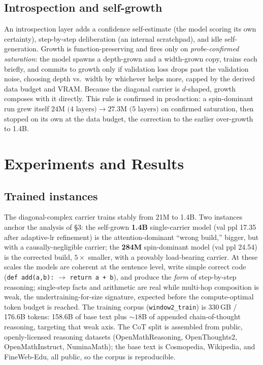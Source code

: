 \documentclass[11pt]{article}
\newcommand{\code}[1]{\texttt{#1}}
\begin{document}
\subsection{Introspection and self-growth}
An introspection layer adds a confidence self-estimate (the model scoring its own certainty), step-by-step deliberation (an internal scratchpad), and idle self-generation. Growth is function-preserving and fires only on \emph{probe-confirmed saturation}: the model spawns a depth-grown and a width-grown copy, trains each briefly, and commits to growth only if validation loss drops past the validation noise, choosing depth vs.\ width by whichever helps more, capped by the derived data budget and VRAM. Because the diagonal carrier is $d$-shaped, growth composes with it directly. This rule is confirmed in production: a spin-dominant run grew itself $24\text{M (4 layers)} \to 27.3\text{M (5 layers)}$ on confirmed saturation, then stopped on its own at the data budget, the correction to the earlier over-growth to 1.4B.

\section{Experiments and Results}
\subsection{Trained instances}
The diagonal-complex carrier trains stably from 21M to 1.4B. Two instances anchor the analysis of \S3: the self-grown \textbf{1.4B} single-carrier model (val ppl 17.35 after adaptive-lr refinement) is the attention-dominant ``wrong build,'' bigger, but with a causally-negligible carrier; the \textbf{284M} spin-dominant model (val ppl 24.54) is the corrected build, $5\times$ smaller, with a provably load-bearing carrier. At these scales the models are coherent at the sentence level, write simple correct code (\code{def add(a,b):} $\to$ \code{return a + b}), and produce the \emph{form} of step-by-step reasoning; single-step facts and arithmetic are real while multi-hop composition is weak, the undertraining-for-size signature, expected before the compute-optimal token budget is reached. The training corpus (\code{window2\_train}) is 330\,GB / 176.6B tokens: 158.6B of base text plus ${\sim}18$B of appended chain-of-thought reasoning, targeting that weak axis. The CoT split is assembled from public, openly-licensed reasoning datasets (OpenMathReasoning, OpenThoughts2, OpenMathInstruct, NuminaMath); the base text is Cosmopedia, Wikipedia, and FineWeb-Edu, all public, so the corpus is reproducible.
\end{document}
